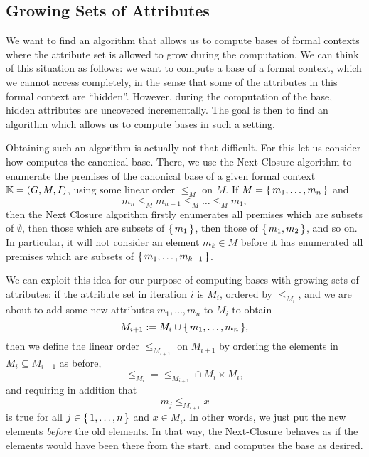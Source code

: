\subsection{Growing Sets of Attributes}
\label{sec:grow-sets-attr}

We want to find an algorithm that allows us to compute bases of formal contexts where the
attribute set is allowed to grow during the computation.  We can think of this situation
as follows: we want to compute a base of a formal context, which we cannot access
completely, in the sense that some of the attributes in this formal context are
\enquote{hidden}.  However, during the computation of the base, hidden attributes are
uncovered incrementally.  The goal is then to find an algorithm which allows us to compute
bases in such a setting.

Obtaining such an algorithm is actually not that difficult.  For this let us consider how
 computes the canonical base.  There, we use the Next-Closure
algorithm to enumerate the premises of the canonical base of a given formal context ${\mathbb{K}} = (G, M, I)$, using some linear order $\leq_{M}$ on $M$.  If $M = {\{\, m_{1}, \dots,
  m_{n} \,\}}$ and
\begin{equation*}
  m_{n} \leq_{M} m_{n-1} \leq_{M} \dots \leq_{M} m_{1},
\end{equation*}
then the Next Closure algorithm firstly enumerates all premises which are subsets of
$\emptyset$, then those which are subsets of ${\{\, m_{1} \,\}}$, then those of ${\{\, m_{1},
  m_{2} \,\}}$, and so on.  In particular, it will not consider an element $m_{k} \in M$
before it has enumerated all premises which are subsets of ${\{\, m_{1}, \dots, m_{k-1}
\,\}}$.

We can exploit this idea for our purpose of computing bases with growing sets of
attributes: if the attribute set in iteration $i$ is $M_{i}$, ordered by $\leq_{M_{i}}$,
and we are about to add some new attributes $m_{1}, \dots, m_{n}$ to $M_{i}$ to obtain
\begin{equation*}
  M_{i+1} := M_{i} \cup {\ensuremath{\{\, m_{1}, \dots, m_{n} \,\}}},
\end{equation*}
then we define the linear order $\leq_{M_{i+1}}$ on $M_{i+1}$ by ordering the elements in
$M_{i} \subseteq M_{i+1}$ as before, \ie
\begin{equation}
  \label{eq:48}
  {\leq_{M_{i}}} = {\leq_{M_{i+1}}} \cap M_{i} \times M_{i},
\end{equation}
and requiring in addition that
\begin{equation}
  \label{eq:49}
  m_{j} \leq_{M_{i+1}} x
\end{equation}
is true for all $j \in {\ensuremath{\{\, 1, \dots, n \,\}}}$ and $x \in M_{i}$.  In other words, we just
put the new elements \emph{before} the old elements.  In that way, the Next-Closure
behaves as if the elements would have been there from the start, and computes the base as
desired.

